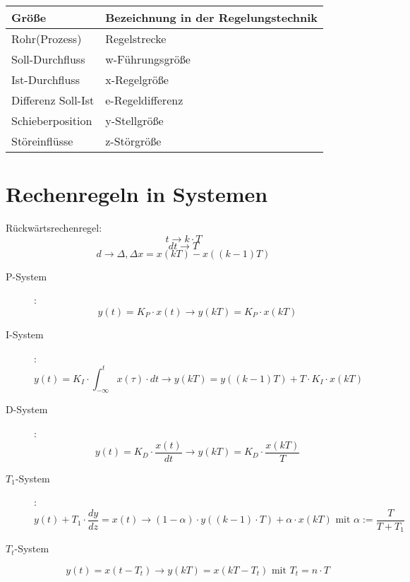 \documentclass[a4paper, 11pt]{scrartcl}
\theoremstyle{definition}
\begin{document}
\begin{tabular}{|l|l|}
	\hline
	\textbf{Größe}& \textbf{Bezeichnung in der Regelungstechnik}\\
	\hline
	Rohr(Prozess)& Regelstrecke\\
	Soll-Durchfluss& w-Führungsgröße\\
	Ist-Durchfluss& x-Regelgröße\\
	Differenz Soll-Ist& e-Regeldifferenz\\
	Schieberposition& y-Stellgröße\\
	Störeinflüsse& z-Störgröße\\
	\hline
\end{tabular}

\section{Rechenregeln in Systemen}
Rückwärtsrechenregel:
\[t\rightarrow k\cdot T\]
\[dt \rightarrow T \]
\[ d \rightarrow \Delta, \Delta x = x(kT)-x((k-1)T) \]

\begin{description}
	\item[P-System]: \[ y(t) = K_P\cdot x(t) \rightarrow y(kT) = K_P\cdot x(kT) \]
	\item[I-System]: \[y(t) = K_I \cdot \int_{-\infty}^{t} x(\tau)\cdot dt \rightarrow y(kT) = y((k-1)T) + T\cdot K_I\cdot x(kT) \]
	\item[D-System]: \[ y(t) = K_D \cdot \frac{x(t)}{dt} \rightarrow y(kT) = K_D\cdot \frac{x(kT)}{T} \]
	\item[$T_1$-System]: \[ y(t) +T_1 \cdot \frac{dy}{dz} =x(t) \rightarrow (1-\alpha)\cdot y((k-1)\cdot T) + \alpha \cdot x(kT)\text{ mit }\alpha := \frac{T}{T+T_1}\] 
	\item[$T_t$-System] \[ y(t) = x(t-T_t) \rightarrow y(kT) = x(kT-T_t) \text{ mit } T_t = n\cdot T \]
\end{description}
\end{document}

